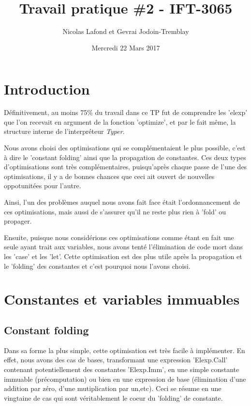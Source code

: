 \documentclass{article}
\begin{document}
\title{Travail pratique \#2 - IFT-3065}
\author{Nicolas Lafond et Gevrai Jodoin-Tremblay}
\date{Mercredi 22 Mars 2017}
\maketitle

\section{Introduction}

Définitivement, au moins 75\% du travail dans ce TP fut de comprendre les 'elexp' que l'on recevait en argument de la fonction 'optimize', et par le fait même, la structure interne de l'interpréteur \emph{Typer}.

Nous avons choisi des optimisations qui se complémentaient le plus possible, c'est à dire le 'constant folding' ainsi que la propagation de constantes. Ces deux types d'optimisations sont très complémentaires, puisqu'après chaque passe de l'une des optimisations, il y a de bonnes chances que ceci ait ouvert de nouvelles oppotunitées pour l'autre.

Ainsi, l'un des problèmes auquel nous avons fait face était l'ordonnancement de ces optimisations, mais aussi de s'assurer qu'il ne reste plus rien à 'fold' ou propager.

Ensuite, puisque nous considérions ces optimisations comme étant en fait une seule ayant trait aux variables, nous avons tenté l'élimination de code mort dans les 'case' et les 'let'. Cette optimisation est des plus utile après la propagation et le 'folding' des constantes et c'est pourquoi nous l'avons choisi.

\section{Constantes et variables immuables}
\subsection{Constant folding}

Dans sa forme la plus simple, cette optimisation est très facile à implémenter. En effet, nous avons des cas de bases, transformant une expression 'Elexp.Call' contenant potentiellement des constantes 'Elexp.Imm', en une simple constante immuable (précomputation) ou bien en une expression de base (élimination d'une addition par zéro, d'une mutiplication par un,etc). Ceci se résume en une vingtaine de cas qui sont véritablement le coeur du 'folding' de constante.
\end{document}
